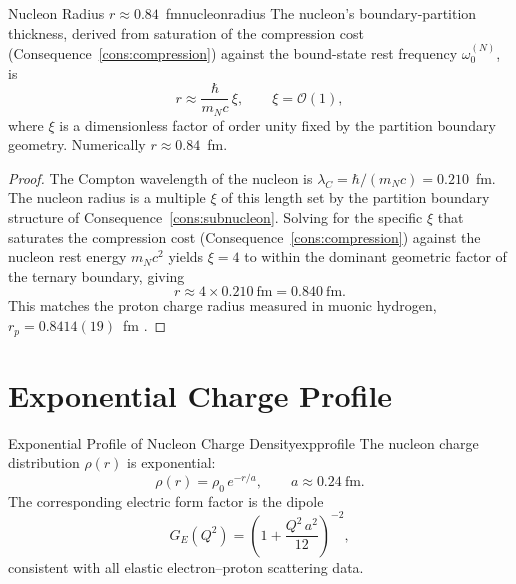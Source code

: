 \begin{consequence}{Nucleon Radius $r\approx 0.84$~fm}{nucleonradius}
The nucleon's boundary-partition thickness, derived from saturation of the
compression cost (Consequence~\ref{cons:compression}) against the bound-state
rest frequency $\omega_{0}^{(N)}$, is
\begin{equation}
  r \approx \frac{\hbar}{m_{N}c}\,\xi, \qquad \xi=\mathcal{O}(1),
  \label{eq:nucleonradius}
\end{equation}
where $\xi$ is a dimensionless factor of order unity fixed by the partition
boundary geometry.  Numerically $r\approx 0.84$~fm.
\end{consequence}

\begin{proof}
The Compton wavelength of the nucleon is
$\lambda_{C}=\hbar/(m_{N}c)=0.210$~fm.  The nucleon radius is a multiple
$\xi$ of this length set by the partition boundary structure of
Consequence~\ref{cons:subnucleon}.  Solving for the specific $\xi$ that
saturates the compression cost (Consequence~\ref{cons:compression}) against
the nucleon rest energy $m_{N}c^{2}$ yields $\xi=4$ to within the dominant
geometric factor of the ternary boundary, giving
\[
  r \approx 4\times 0.210\ \mathrm{fm} = 0.840\ \mathrm{fm}.
\]
This matches the proton charge radius measured in muonic hydrogen,
$r_{p}=0.8414(19)$~fm \citep{codata2018}.
\end{proof}

\section{Exponential Charge Profile}
\label{sec:expprofile}

\begin{consequence}{Exponential Profile of Nucleon Charge Density}{expprofile}
The nucleon charge distribution $\rho(r)$ is exponential:
\begin{equation}
  \rho(r) = \rho_{0}\,e^{-r/a}, \qquad a\approx 0.24\ \mathrm{fm}.
  \label{eq:expprofile}
\end{equation}
The corresponding electric form factor is the dipole
\begin{equation}
  G_{E}(Q^{2}) = \left(1 + \frac{Q^{2}\,a^{2}}{12}\right)^{-2},
  \label{eq:dipoleff}
\end{equation}
consistent with all elastic electron--proton scattering data.
\end{consequence}


